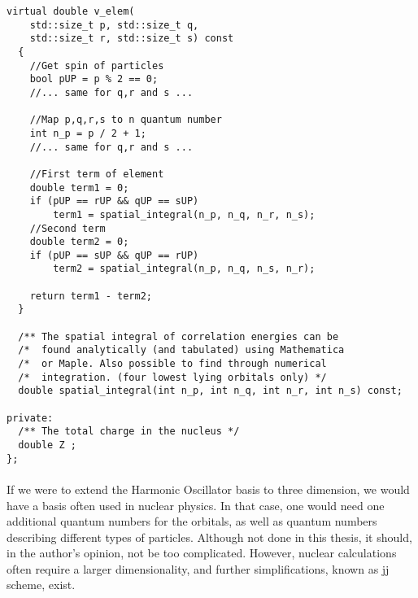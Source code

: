 \begin{lstlisting}[float,label={lst:qDots:atoms_p2},caption={Continuation of listing~\ref{lst:qDots:atoms_p1}.},name={lst:qDots:atoms}]
  virtual double v_elem(
    std::size_t p, std::size_t q,
    std::size_t r, std::size_t s) const
  {
    //Get spin of particles
    bool pUP = p % 2 == 0;
	//... same for q,r and s ...

    //Map p,q,r,s to n quantum number
    int n_p = p / 2 + 1;
    //... same for q,r and s ...

    //First term of element
    double term1 = 0;
    if (pUP == rUP && qUP == sUP)
        term1 = spatial_integral(n_p, n_q, n_r, n_s);
    //Second term
    double term2 = 0;
    if (pUP == sUP && qUP == rUP)
        term2 = spatial_integral(n_p, n_q, n_s, n_r);
	
    return term1 - term2;
  }

  /** The spatial integral of correlation energies can be
  /*  found analytically (and tabulated) using Mathematica
  /*  or Maple. Also possible to find through numerical
  /*  integration. (four lowest lying orbitals only) */
  double spatial_integral(int n_p, int n_q, int n_r, int n_s) const;
            
private:
  /** The total charge in the nucleus */
  double Z ;
};
\end{lstlisting}


\paragraph{}
If we were to extend the Harmonic Oscillator basis to three dimension, we would have a basis often used in nuclear physics. 
In that case, one would need one additional quantum numbers for the orbitals, as well as quantum numbers describing different types of particles.
Although not done in this thesis, it should, in the author's opinion, not be too complicated.
However, nuclear calculations often require a larger dimensionality, and further simplifications, known as jj scheme, exist.


